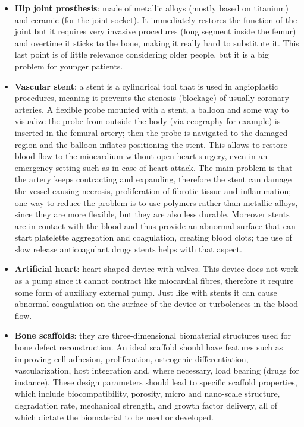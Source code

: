   \begin{multicols}{2}
    \begin{itemize}
      \item \textbf{Hip joint prosthesis}: made of metallic alloys (mostly based on titanium) and ceramic (for the joint socket).
        It immediately restores the function of the joint but it requires very invasive procedures (long segment inside the femur) and overtime it sticks to the bone, making it really hard to substitute it.
        This last point is of little relevance considering older people, but it is a big problem for younger patients.
      \item \textbf{Vascular stent}: a stent is a cylindrical tool that is used in angioplastic procedures, meaning it prevents the stenosis (blockage) of usually coronary arteries.
        A flexible probe mounted with a stent, a balloon and some way to visualize the probe from outside the body (via ecography for example) is inserted in the femural artery; then the probe is navigated to the damaged region and the balloon inflates positioning the stent.
        This allows to restore blood flow to the miocardium without open heart surgery, even in an emergency setting such as in case of heart attack.
        The main problem is that the artery keeps contracting and expanding, therefore the stent can damage the vessel causing necrosis, proliferation of fibrotic tissue and inflammation; one way to reduce the problem is to use polymers rather than metallic alloys, since they are more flexible, but they are also less durable.
        Moreover stents are in contact with the blood and thus provide an abnormal surface that can start platelette aggregation and coagulation, creating blood clots; the use of slow release anticoagulant drugs stents helps with that aspect.
      \item \textbf{Artificial heart}: heart shaped device with valves.
        This device does not work as a pump since it cannot contract like miocardial fibres, therefore it require some form of auxiliary external pump.
        Just like with stents it can cause abnormal coagulation on the surface of the device or turbolences in the blood flow.
      \item \textbf{Bone scaffolds}: they are three-dimensional biomaterial structures used for bone defect reconstruction.
        An ideal scaffold should have features such as improving cell adhesion, proliferation, osteogenic differentiation, vascularization, host integration and, where necessary, load bearing (drugs for instance).
        These design parameters should lead to specific scaffold properties, which include biocompatibility, porosity, micro and nano-scale structure, degradation rate, mechanical strength, and growth factor delivery, all of which dictate the biomaterial to be used or developed.
    \end{itemize}
  \end{multicols}

